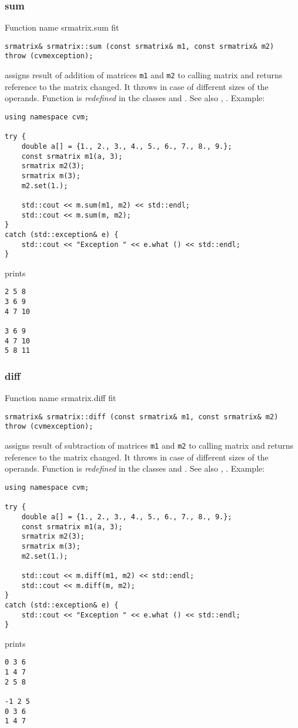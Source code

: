 \subsubsection{sum}
Function%
\pdfdest name {srmatrix.sum} fit
\begin{verbatim}
srmatrix& srmatrix::sum (const srmatrix& m1, const srmatrix& m2)
throw (cvmexception);
\end{verbatim}
assigns  result of addition of
matrices \verb"m1" and \verb"m2"  to  calling matrix
and returns  reference to
the matrix changed.
It throws  
in case of different sizes of the operands.
Function is \emph{redefined} in the classes
and .
See also ,
.
Example:
\begin{Verbatim}
using namespace cvm;

try {
    double a[] = {1., 2., 3., 4., 5., 6., 7., 8., 9.};
    const srmatrix m1(a, 3);
    srmatrix m2(3);
    srmatrix m(3);
    m2.set(1.);

    std::cout << m.sum(m1, m2) << std::endl;
    std::cout << m.sum(m, m2);
}
catch (std::exception& e) {
    std::cout << "Exception " << e.what () << std::endl;
}
\end{Verbatim}
prints
\begin{Verbatim}
2 5 8
3 6 9
4 7 10

3 6 9
4 7 10
5 8 11
\end{Verbatim}
\newpage



\subsubsection{diff}
Function%
\pdfdest name {srmatrix.diff} fit
\begin{verbatim}
srmatrix& srmatrix::diff (const srmatrix& m1, const srmatrix& m2)
throw (cvmexception);
\end{verbatim}
assigns  result of subtraction of
matrices \verb"m1" and \verb"m2" to  calling matrix
and returns  reference to
the matrix changed.
It throws  
in case of different sizes of the operands.
Function is \emph{redefined} in the classes
and .
See also ,
.
Example:
\begin{Verbatim}
using namespace cvm;

try {
    double a[] = {1., 2., 3., 4., 5., 6., 7., 8., 9.};
    const srmatrix m1(a, 3);
    srmatrix m2(3);
    srmatrix m(3);
    m2.set(1.);

    std::cout << m.diff(m1, m2) << std::endl;
    std::cout << m.diff(m, m2);
}
catch (std::exception& e) {
    std::cout << "Exception " << e.what () << std::endl;
}
\end{Verbatim}
prints
\begin{Verbatim}
0 3 6
1 4 7
2 5 8

-1 2 5
0 3 6
1 4 7
\end{Verbatim}
\newpage



